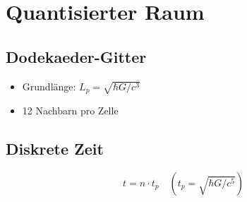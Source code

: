 \section{Quantisierter Raum}
\subsection*{Dodekaeder-Gitter}
\begin{itemize}
    \item Grundlänge: $L_p = \sqrt{\hbar G/c^3}$
    \item 12 Nachbarn pro Zelle
\end{itemize}

\subsection*{Diskrete Zeit}
\[ t = n \cdot t_p \quad (t_p = \sqrt{\hbar G/c^5}) \]